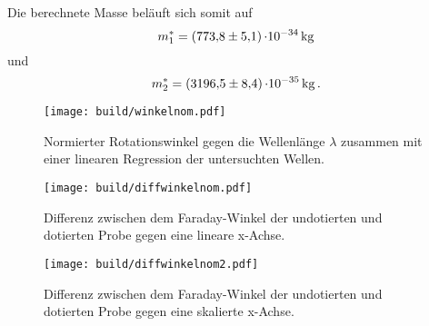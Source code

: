 Die berechnete Masse beläuft sich somit auf 
\begin{equation*}
    m^*_1 = \SI{773.8 \pm 5.1}{\cdot 10^{-34}}\,\si{\kilo\gram}\, \\
\end{equation*}
und
\begin{equation*}
    m^*_2 = \SI{3196.5 \pm 8.4}{\cdot 10^{-35}}\,\si{\kilo\gram} \,.   \\
\end{equation*}

\begin{figure}[H]
    \centering
    \texttt{[image: build/winkelnom.pdf]}
    \caption{Normierter Rotationswinkel gegen die Wellenlänge $\lambda$ zusammen mit einer linearen Regression der untersuchten Wellen.}
    \label{fig:Winkel_nom}
\end{figure}


\begin{figure}[H]
    \centering
    \texttt{[image: build/diffwinkelnom.pdf]}
    \caption{Differenz zwischen dem Faraday-Winkel der undotierten und dotierten Probe gegen eine lineare x-Achse.}
    \label{fig:Winkel_nom_diff}
\end{figure}


\begin{figure}[H]
    \centering
    \texttt{[image: build/diffwinkelnom2.pdf]}
    \caption{Differenz zwischen dem Faraday-Winkel der undotierten und dotierten Probe gegen eine skalierte x-Achse.}
    \label{fig:Winkel_nom_diff2}
\end{figure}


